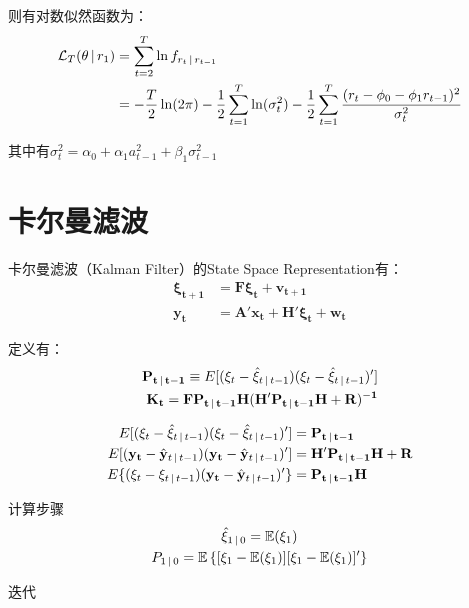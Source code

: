 \documentclass[11pt]{article}
\begin{document}
则有对数似然函数为：
\begin{align*}
    \mathcal{L}_T(\theta \,\vert\, r_1) &= \sum_{t=2}^{T} \ln f_{r_{t} \,\vert\, r_{t-1}} \\
    &= -\frac{T}{2}\ln(2\pi) - \frac{1}{2} \sum_{t=1}^{T} \ln(\sigma_{t}^{2}) - \frac{1}{2} \sum_{t=1}^{T} \frac{(r_{t} - \phi_0 -\phi_1 r_{t-1})^2}{\sigma_{t}^{2}}
\end{align*}

其中有$\sigma_t^2 = \alpha_0 + \alpha_1 a_{t-1}^{2} + \beta_1 \sigma_{t-1}^{2}$

\section{卡尔曼滤波}

卡尔曼滤波（Kalman Filter）的State Space Representation有：
\begin{align*}
   \mathbf{\xi_{t+1}} &= \mathbf{F \xi_{t}} + \mathbf{v_{t+1}} \\
   \mathbf{y_{t}} &= \mathbf{A'} \mathbf{x_{t}} + \mathbf{H'\xi_{t}} + \mathbf{w_t}
\end{align*}

定义有：
\begin{align*}
    \mathbf{P_{t\,\vert\, t-1}} \equiv E[(\xi_{t} - \hat{\xi}_{t\,\vert\, t-1})(\xi_{t} - \hat{\xi}_{t\,\vert\, t-1})'] \\
    \mathbf{K_t} = \mathbf{FP_{t\,\vert\, t-1}H(H'P_{t\,\vert\, t-1}H+R)^{-1}}
\end{align*}

\begin{align*}
    E[(\xi_{t} - \hat{\xi}_{t\,\vert\, t-1})(\xi_{t} - \hat{\xi}_{t\,\vert\, t-1})'] &= \mathbf{P_{t\,\vert\, t-1}} \\ E[(\mathbf{y_t} - \hat{\mathbf{y}}_{t\,\vert\, t-1})(\mathbf{y_t} - \hat{\mathbf{y}}_{t\,\vert\, t-1})'] &= \mathbf{H'P_{t\,\vert\, t-1}H+R} \\
    E\{(\xi_t - \xi_{t\,\vert\, t-1})(\mathbf{y_t} - \hat{\mathbf{y}}_{t\,\vert\, t-1})'\} &= \mathbf{P_{t\,\vert\, t-1}H} \\
\end{align*}

计算步骤
\begin{gather*}
    \hat{\xi}_{1\,\vert\, 0} = \mathbb{E}(\xi_1) \\
    P_{1\,\vert\, 0} = \mathbb{E} \left\{[\xi_1 - \mathbb{E}(\xi_1)][\xi_1 - \mathbb{E}(\xi_1)]'\right\}
\end{gather*}

迭代
\end{document}
